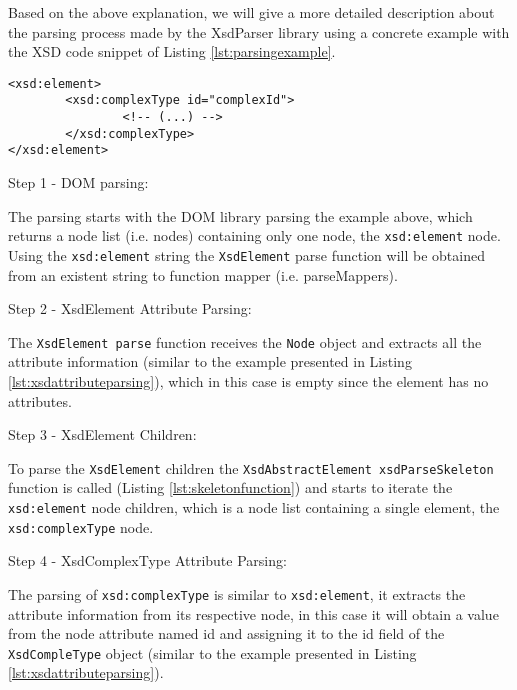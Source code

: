 \noindent
Based on the above explanation, we will give a more detailed description about the parsing process made by the XsdParser library using a concrete example with the \ac{XSD} code snippet of Listing \ref{lst:parsingexample}.

\bigskip


\begin{minipage}{\linewidth}
\begin{lstlisting}[caption={Parsing Concrete Example},captionpos=b,label={lst:parsingexample}]
<xsd:element>
		<xsd:complexType id="complexId">
				<!-- (...) -->
		</xsd:complexType>
</xsd:element>
\end{lstlisting}
\end{minipage}


Step 1 - DOM parsing:

\noindent
The parsing starts with the \ac{DOM} library parsing the example above, which returns a node list (i.e. nodes) containing only one node, the \texttt{xsd:element} node. Using the \texttt{xsd:element} string the \texttt{XsdElement} parse function will be obtained from an existent string to function mapper (i.e. parseMappers). 

Step 2 - XsdElement Attribute Parsing:

\noindent
The \texttt{XsdElement parse} function receives the \texttt{Node} object and extracts all the attribute information (similar to the example presented in Listing \ref{lst:xsdattributeparsing}), which in this case is empty since the element has no attributes. 

Step 3 - XsdElement Children:

\noindent
To parse the \texttt{XsdElement} children the \texttt{XsdAbstractElement xsdParseSkeleton} function is called (Listing \ref{lst:skeletonfunction}) and starts to iterate the \texttt{xsd:element} node children, which is a node list containing a single element, the \texttt{xsd:complexType} node. 

Step 4 - XsdComplexType Attribute Parsing:

\noindent
The parsing of \texttt{xsd:complexType} is similar to \texttt{xsd:element}, it extracts the attribute information from its respective node, in this case it will obtain a value from the node attribute named id and assigning it to the id field of the \texttt{XsdCompleType} object (similar to the example presented in Listing \ref{lst:xsdattributeparsing}). 


